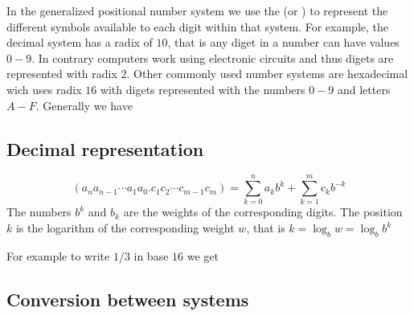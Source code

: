 \myindent In the generalized positional number system we use the  (or ) to represent the different symbols available to each digit within that system. For example, the decimal system has a radix of $10$, that is any diget in a number can have values $0-9$. In contrary computers work using electronic circuits and thus digets are represented with radix $2$. Other commonly used number systems are hexadecimal wich uses radix $16$ with digets represented with the numbers $0-9$ and letters $A-F$. Generally we have

\subsection{Decimal representation}
\[
(a_{n}a_{n-1} \cdots a_{1}a_{0} . c_{1}c_{2} \cdots c_{m-1}c_{m}) = 
    \sum_{k=0}^{n}a_{k}b^{k} + \sum_{k=1}^{m}c_{k}b^{-k}
\]
The numbers $b^{k}$ and $b_{k}$ are the weights of the corresponding digits. The position $k$ is the logarithm of the corresponding weight $w$, that is $k = \log_{b} w = \log_{b} b^k$ 


For example to write $1/3$ in base $16$ we get 

\subsection{Conversion between systems}

